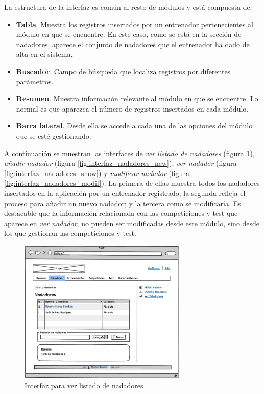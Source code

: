   	La estructura de la interfaz es común al resto de módulos y está compuesta de:

  	\begin{itemize}
  		\item {{\bf Tabla}. Muestra los registros insertados por un entrenador pertenecientes al módulo en que se encuentre. En este caso, como se está en la sección de nadadores, aparece el conjunto de nadadores que el entrenador ha dado de alta en el sistema.}
  		\item {{\bf Buscador}. Campo de búsqueda que localiza registros por diferentes parámetros.}
  		\item {{\bf Resumen}. Muestra información relevante al módulo en que se encuentre. Lo normal es que aparezca el número de registros insertados en cada módulo.}
  		\item {{\bf Barra lateral}. Desde ella se accede a cada una de las opciones del módulo que se esté gestionando.}
  	\end{itemize}

  	A continuación se muestran las interfaces de {\it ver listado de nadadores} (figura \ref{fig:interfaz_nadadores}), {\it añadir nadador} (figura \ref{fig:interfaz_nadadores_new}), {\it ver nadador} (figura \ref{fig:interfaz_nadadores_show}) y {\it modificar nadador} (figura \ref{fig:interfaz_nadadores_modif}). La primera de ellas muestra todos los nadadores insertados en la aplicación por un entrenador registrado; la segunda refleja el proceso para añadir un nuevo nadador; y la tercera como se modificaría. Es destacable que la información relacionada con las competiciones y test que aparece en {\it ver nadador}, no pueden ser modificadas desde este módulo, sino desde los que gestionan las competiciones y test.

  	\begin{figure}[H]
  	  \centering
  	    \includegraphics[width=8cm]{./eps/p_interfaz/10_Nadadores.eps}
  	  \caption{Interfaz para ver listado de nadadores}
  	  \label{fig:interfaz_nadadores}
  	\end{figure}

